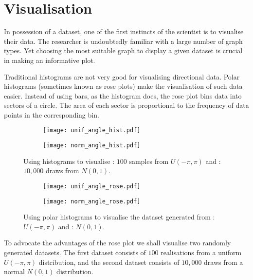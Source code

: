 \section{Visualisation}
\label{sec:circular_visualisation}

In possession of a dataset, one of the first instincts of the scientist is to visualise their data. The researcher is undoubtedly familiar with a large number of graph types. Yet choosing the most suitable graph to display a given dataset is crucial in making an informative plot.

Traditional histograms are not very good for visualising directional data. Polar histograms (sometimes known as rose plots) make the visualisation of such data easier. Instead of using bars, as the histogram does, the rose plot bins data into sectors of a circle. The area of each sector is proportional to the frequency of data points in the corresponding bin.

\begin{figure}[!tbp]
	\begin{subfigure}[b]{0.48\textwidth}
		\texttt{[image: unif\_angle\_hist.pdf]}
		\caption{}
		\label{subfig:unif_angle_hist}
	\end{subfigure}%
	\hspace{0.01\textwidth}
	\begin{subfigure}[b]{0.48\textwidth}
		\texttt{[image: norm\_angle\_hist.pdf]}
		\caption{}
		\label{subfig:norm_angle_hist}
	\end{subfigure}
	\caption{Using histograms to visualise : $100$ samples from $U(-\pi, \pi)$ and : $10,000$ draws from $N(0, 1)$.}
	\label{fig:angle_hist}
\end{figure}

\begin{figure}[!tbp]
	\begin{subfigure}[b]{0.45\textwidth}
		\texttt{[image: unif\_angle\_rose.pdf]}
		\caption{}
		\label{subfig:unif_angle_rose}
	\end{subfigure}%
	\hspace{0.05\textwidth}%
	\begin{subfigure}[b]{0.45\textwidth}
		\texttt{[image: norm\_angle\_rose.pdf]}
		\caption{}
		\label{subfig:norm_angle_rose}
	\end{subfigure}
	\caption{Using polar histograms to visualise the dataset generated from : $U(-\pi,\pi)$ and : $N(0, 1)$.}
	\label{fig:angle_rose}
\end{figure}
To advocate the advantages of the rose plot we shall visualise two randomly generated datasets. The first dataset consists of $100$ realisations from a uniform $U(-\pi,\pi)$ distribution, and the second dataset consists of $10,000$ draws from a normal $N(0, 1)$ distribution.


